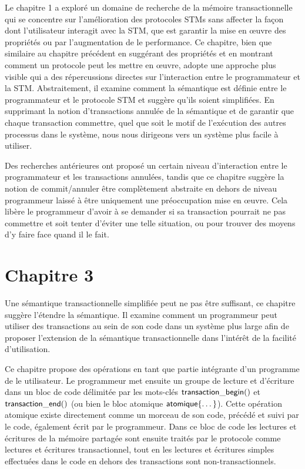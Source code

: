 Le chapitre 1 a exploré un domaine de recherche de la mémoire transactionnelle qui se concentre sur
l'amélioration des protocoles STMs sans affecter la façon dont l'utilisateur interagit avec la STM,
que est garantir la mise en œuvre des propriétés ou par l'augmentation de le performance.
Ce chapitre, bien que similaire au chapitre précédent en suggérant des propriétés et en montrant comment un protocole peut les mettre en œuvre,
adopte une approche plus visible qui a des répercussions directes sur l'interaction entre le programmateur et la STM.
Abstraitement, il examine comment la sémantique est définie entre le programmateur et le protocole STM et suggère qu'ils soient simplifiées.
En supprimant la notion d'transactions annulée de la sémantique et de garantir que chaque transaction commettre,
quel que soit le motif de l'exécution des autres processus dans le système, nous nous dirigeons vers un système plus facile à utiliser.


Des recherches antérieures ont proposé un certain niveau d'interaction entre le programmateur et les transactions annulées,
tandis que ce chapitre suggère la notion de commit/annuler être complètement abstraite en dehors de niveau programmeur laissé à être uniquement une préoccupation mise en œuvre.
Cela libère le programmeur d'avoir à se demander si sa transaction pourrait ne pas commettre et soit tenter d'éviter une telle situation, ou pour trouver des moyens d'y faire face quand il le fait.


\section*{Chapitre 3}

Une sémantique transactionnelle simplifiée peut ne pas être suffisant, ce chapitre suggère l'étendre la sémantique.
Il examine comment un programmeur peut utiliser des transactions au sein de son code dans un système plus large afin de proposer
l'extension de la sémantique transactionnelle dans l'intérêt de la facilité d'utilisation.

Ce chapitre propose des opérations en tant que partie intégrante d'un programme de le utilisateur.
Le programmeur met ensuite un groupe de lecture et d'écriture dans un bloc de code délimitée par les mots-clés
$\act{transaction\_begin}()$ et $\act{transaction\_end}()$ (ou bien le bloc atomique $\act{atomique}\{ \dots \} $).
Cette opération atomique existe directement comme un morceau de son code, précédé et suivi par le code, également écrit par le programmeur.
Dans ce bloc de code les lectures et écritures de la mémoire partagée sont ensuite traités par le protocole comme lectures et écritures transactionnel,
tout en les lectures et écritures simples effectuées dans le code en dehors des transactions sont non-transactionnels.


